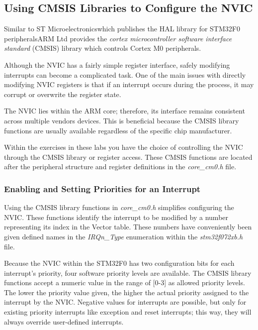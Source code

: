 \documentclass[11pt,fleqn]{book} %
\begin{document}
 
\subsection{Using CMSIS Libraries to Configure the NVIC}
Similar to ST Microelectronics\textemdash which publishes the HAL library for STM32F0 peripherals\textemdash ARM Ltd provides the \textit{cortex microcontroller software interface standard} (CMSIS) library which controls Cortex M0 peripherals. 

Although the NVIC has a fairly simple register interface, safely modifying interrupts can become a complicated task. One of the main issues with directly modifying NVIC registers is that if an interrupt occurs during the process, it may corrupt or overwrite the register state.  

The NVIC lies within the ARM core; therefore, its interface remains consistent across multiple vendors devices. This is beneficial because the CMSIS library functions are usually available regardless of the specific chip manufacturer. 

Within the exercises in these labs you have the choice of controlling the NVIC through the CMSIS library or register access. These CMSIS functions are located after the peripheral structure and register definitions in the \textit{core\_cm0.h} file. 

\subsubsection{Enabling and Setting Priorities for an Interrupt}

Using the CMSIS library functions in \textit{core\_cm0.h} simplifies configuring the NVIC. These functions identify the interrupt to be modified by a number representing its index in the Vector table. These numbers have conveniently been given defined names in the \textit{IRQn\_Type} enumeration within the \textit{stm32f072xb.h} file.  

Because the NVIC within the STM32F0 has two configuration bits for each interrupt's priority, four software priority levels are available. The CMSIS library functions accept a numeric value in the range of [0-3] as allowed priority levels. The lower the priority value given, the higher the actual priority assigned to the interrupt by the NVIC. Negative values for interrupts are possible, but only for existing priority interrupts like exception and reset interrupts; this way, they will always override user-defined interrupts.
\end{document}

